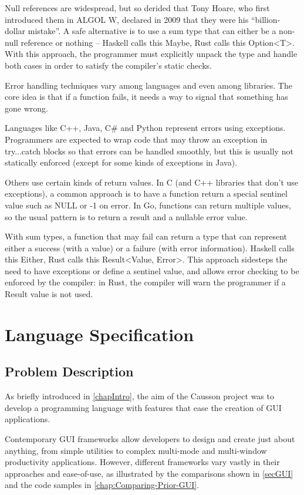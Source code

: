 \documentclass[11pt]{report}
\begin{document}
Null references are widespread, but so derided that Tony Hoare, who first introduced them in ALGOL W, declared in 2009 that they were his “billion-dollar mistake”\cite{NullRefs}. A safe alternative is to use a sum type that can either be a non-null reference or nothing – Haskell calls this Maybe, Rust calls this Option<T>. With this approach, the programmer must explicitly unpack the type and handle both cases in order to satisfy the compiler's static checks.

Error handling techniques vary among languages and even among libraries. The core idea is that if a function fails, it needs a way to signal that something has gone wrong.

Languages like C++, Java, C\# and Python represent errors using exceptions. Programmers are expected to wrap code that may throw an exception in try...catch blocks so that errors can be handled smoothly, but this is usually not statically enforced (except for some kinds of exceptions in Java).

Others use certain kinds of return values. In C (and C++ libraries that don't use exceptions), a common approach is to have a function return a special sentinel value such as NULL or -1 on error. In Go, functions can return multiple values, so the usual pattern is to return a result and a nullable error value.

With sum types, a function that may fail can return a type that can represent either a success (with a value) or a failure (with error information). Haskell calls this Either, Rust calls this Result<Value, Error>. This approach sidesteps the need to have exceptions or define a sentinel value, and allows error checking to be enforced by the compiler: in Rust, the compiler will warn the programmer if a Result value is not used\cite{RustResult}.

\chapter{Language Specification} \label{chapSpec}

\section{Problem Description}

As briefly introduced in \cref{chapIntro}, the aim of the Causson project was to develop a programming language with features that ease the creation of GUI applications.

Contemporary GUI frameworks allow developers to design and create just about anything, from simple utilities to complex multi-mode and multi-window productivity applications. However, different frameworks vary vastly in their approaches and ease-of-use, as illustrated by the comparisons shown in \cref{secGUI} and the code samples in \cref{chap:Comparing-Prior-GUI}.
\end{document}
